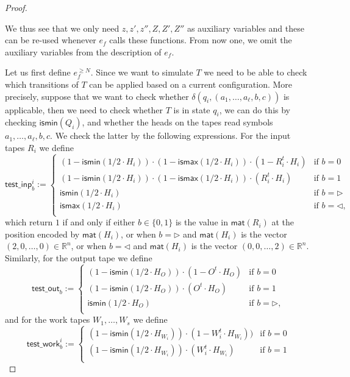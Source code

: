 \begin{proof}
\begin{itemize}
\end{itemize}
We thus see that we only need $z,z',z'',Z,Z',Z''$ as auxiliary variables and these can be re-used whenever $e_f$ calls these functions. From now one, we omit the auxiliary variables from the description of $e_f$.


Let us first define $e_f^{\geq N}$. Since we want to simulate $T$ we need to be able to check which transitions of $T$ can be applied based on a current configuration. More precisely,
suppose that we want to check whether $\delta(q_i,(a_1,\ldots,a_{\ell},b,c))$ is applicable, then we need to check whether $T$ is in state $q_i$, we can do this by checking 
$\mathsf{ismin}(Q_i)$, and whether the heads on the tapes read symbols $a_1,\ldots,a_{\ell},b,c$. We check the latter by the following expressions.
For the input tapes $R_i$ we define
$$
\mathsf{test\_inp}^i_b:=\begin{cases}
(1-\mathsf{ismin}(1/2\cdot H_i))\cdot(1-\mathsf{ismax}(1/2\cdot H_i))\cdot(1- R_i^t\cdot H_i) & \text{if $b=0$}\\
(1-\mathsf{ismin}(1/2\cdot H_i))\cdot(1-\mathsf{ismax}(1/2\cdot H_i))\cdot(R_i^t\cdot H_i) & \text{if $b=1$}\\
\mathsf{ismin}(1/2\cdot H_i) & \text{if $b=\rhd$}\\
\mathsf{ismax}(1/2\cdot H_i) & \text{if $b=\lhd$},\\
\end{cases}
$$
which return $1$ if and only if either $b\in\{0,1\}$ is the value in $\mathsf{mat}(R_i)$ at the position encoded by $\mathsf{mat}(H_i)$, or when $b=\rhd$ and $\mathsf{mat}(H_i)$ is the vector $(2,0,\ldots,0)\in\mathbb{R}^n$, or when $b=\lhd$ and $\mathsf{mat}(H_i)$ is the vector $(0,0,\ldots,2)\in\mathbb{R}^n$. Similarly, for the output tape we define
$$
\mathsf{test\_out}_b:=\begin{cases}
(1-\mathsf{ismin}(1/2\cdot H_O))\cdot(1- O^t\cdot H_O) & \text{if $b=0$}\\
(1-\mathsf{ismin}(1/2\cdot H_O))\cdot(O^t\cdot H_O) & \text{if $b=1$}\\
\mathsf{ismin}(1/2\cdot H_O) & \text{if $b=\rhd$},\\
\end{cases}
$$
and for the work tapes $W_1,\ldots,W_s$ we define
$$
\mathsf{test\_work}^i_b:=\begin{cases}
(1-\mathsf{ismin}(1/2\cdot H_{W_i}))\cdot(1- W_i^t\cdot H_{W_i})) & \text{if $b=0$}\\
(1-\mathsf{ismin}(1/2\cdot H_{W_i}))\cdot (W_i^t\cdot H_{W_i}) & \text{if $b=1$}\\

\end{cases}$$
\end{proof}
